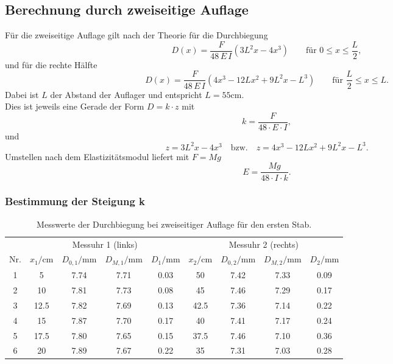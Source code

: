 \subsection{Berechnung durch zweiseitige Auflage}

Für die zweiseitige Auflage gilt nach der Theorie für die Durchbiegung
\begin{equation}
  D(x) = \frac{F}{48\,E\,I}\left(3L^2x - 4x^3\right)
  \qquad \text{für } 0 \le x \le \frac{L}{2},
\end{equation}
und für die rechte Hälfte
\begin{equation}
  D(x) = \frac{F}{48\,E\,I}\left(4x^3 - 12Lx^2 + 9L^2x - L^3\right)
  \qquad \text{für } \frac{L}{2} \le x \le L.
\end{equation}
Dabei ist $L$ der Abstand der Auflager und entspricht $L = 55 \unit{\centi\meter}$. \\
Dies ist jeweils eine Gerade der Form $D = k \cdot z$ mit
\begin{equation}
  k = \frac{F}{48 \cdot E \cdot I},
\end{equation}
und
\begin{equation}
  z = 3L^2x - 4x^3 \quad \text{bzw.} \quad z = 4x^3 - 12Lx^2 + 9L^2x - L^3 .
\end{equation}
Umstellen nach dem Elastizitätsmodul liefert mit $F = M g$
\begin{equation}
  E = \frac{M g}{48 \cdot I \cdot k}.
\end{equation}

\subsubsection{Bestimmung der Steigung k}
\begin{table}[H]
  \centering
  \caption{Messwerte der Durchbiegung bei zweiseitiger Auflage für den ersten Stab.}
  \label{tab:zweiseitig}
  \begin{tabular}{c c c c c c c c c}
    \toprule
    & \multicolumn{4}{c}{Messuhr 1 (links)} & \multicolumn{4}{c}{Messuhr 2 (rechts)} \\
    \cmidrule(lr){2-5} \cmidrule(lr){6-9}
    Nr. & $x_1/\unit{\centi\meter}$ & $D_{0,1}/\unit{\milli\meter}$ & $D_{M,1}/\unit{\milli\meter}$ & $D_1/\unit{\milli\meter}$
        & $x_2/\unit{\centi\meter}$ & $D_{0,2}/\unit{\milli\meter}$ & $D_{M,2}/\unit{\milli\meter}$ & $D_2/\unit{\milli\meter}$ \\
    \midrule
    1 &  5&  7.74&  7.71    & 0.03  & 50 & 7.42 & 7.33  & 0.09 \\
    2 &  10&  7.81&  7.73   & 0.08 & 45 & 7.46 & 7.29 & 0.17 \\
    3 &  12.5&  7.82& 7.69  & 0.13 &  42.5& 7.36 & 7.14 & 0.22 \\
    4 &  15&   7.87 & 7.70  & 0.17 & 40 & 7.41 & 7.17 &0.24\\
    5 &  17.5&  7.80&  7.65 & 0.15 & 37.5 & 7.46  &7.10  & 0.36  \\
    6 &  20&   7.89 &  7.67 & 0.22 &  35& 7.31 & 7.03 & 0.28\\
    \bottomrule
  \end{tabular}
\end{table}

